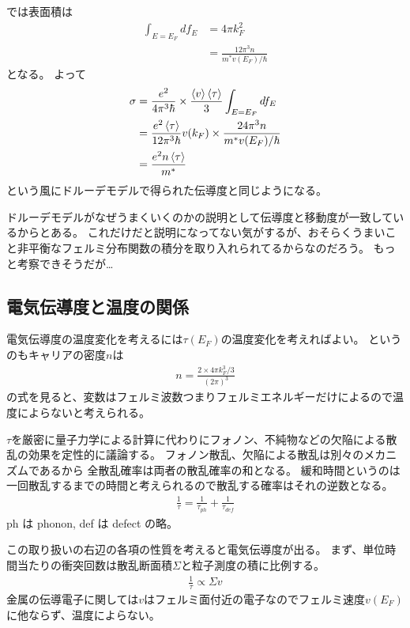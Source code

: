 \documentclass[11pt,dvipdfmx,a4paper]{jsarticle}
\begin{document}
では表面積は
\begin{align}
    \int_{E=E_F} df_E &= 4\pi k_F^2\\ %
    &=\frac{12\pi^3n}{m^*v(E_F)/\hbar}
\end{align}
となる。%
よって
\begin{align}
    \sigma &= \frac{e^2}{4\pi^3\hbar}\times \frac{\ev{v}\ev{\tau}}{3}\int_{E=E_F} df_E\\
    &=\frac{e^2\ev{\tau}}{12\pi^3\hbar} v(k_F) \times\frac{24\pi^3n}{m^*v(E_F)/\hbar}\\
    &=\frac{e^2n\ev{\tau}}{m^*}
\end{align}
という風にドルーデモデルで得られた伝導度と同じようになる。

ドルーデモデルがなぜうまくいくのかの説明として伝導度と移動度が一致しているからとある。
これだけだと説明になってない気がするが、おそらくうまいこと非平衡なフェルミ分布関数の積分を取り入れられてるからなのだろう。
もっと考察できそうだが\dots

\subsection{電気伝導度と温度の関係}
電気伝導度の温度変化を考えるには\(\tau(E_F)\)の温度変化を考えればよい。
というのもキャリアの密度\(n\)は
\begin{align}
    n = \frac{2\times 4\pi k_F^3 /3}{(2\pi)^3} %
\end{align}
の式を見ると、変数はフェルミ波数つまりフェルミエネルギーだけによるので温度によらないと考えられる。

\(\tau\)を厳密に量子力学による計算に代わりにフォノン、不純物などの欠陥による散乱の効果を定性的に議論する。
フォノン散乱、欠陥による散乱は別々のメカニズムであるから
全散乱確率は両者の散乱確率の和となる。
緩和時間というのは一回散乱するまでの時間と考えられるので散乱する確率はそれの逆数となる。
\begin{align}
    \frac{1}{\tau} = \frac{1}{\tau_{ph}} +\frac{1}{\tau_{def}} %
\end{align}
ph は phonon, def は defect の略。

この取り扱いの右辺の各項の性質を考えると電気伝導度が出る。
まず、単位時間当たりの衝突回数は散乱断面積\(\Sigma\)と粒子測度の積に比例する。
\begin{align}
    \frac{1}{\tau} \propto \Sigma v
\end{align}
金属の伝導電子に関しては\(v\)はフェルミ面付近の電子なのでフェルミ速度\(v(E_F)\)に他ならず、温度によらない。
\end{document}
